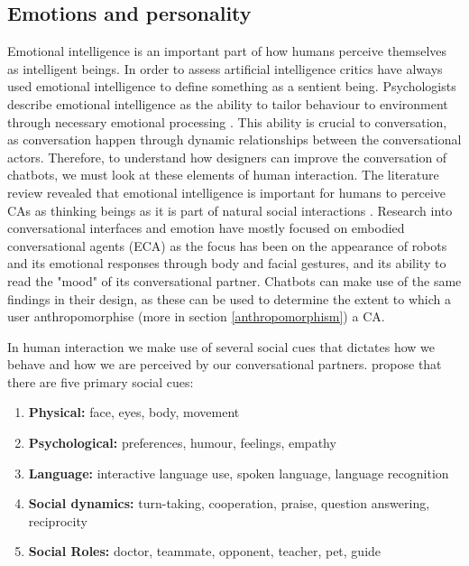 \subsection{Emotions and personality}
    \label{emotionspersonality}
Emotional intelligence is an important part of how humans perceive themselves as intelligent beings. In order to assess artificial intelligence critics have always used emotional intelligence to define something as a sentient being. Psychologists describe emotional intelligence as the ability to tailor behaviour to environment through necessary emotional processing \citep{callejas2011}. This ability is crucial to conversation, as conversation happen through dynamic relationships between the conversational actors. Therefore, to understand how designers can improve the conversation of chatbots, we must look at these elements of human interaction. The literature review revealed that emotional intelligence is important for humans to perceive CAs as thinking beings as it is part of natural social interactions \citep{Griol2015a,Griol2017,Balzarotti2014,Lemon2012,Mencia2012,McTear2016a}. Research into conversational interfaces and emotion have mostly focused on embodied conversational agents (ECA) \citep{Lester1997,Stern2003, Beun2003,Reeves1996} as the focus has been on the appearance of robots and its emotional responses through body and facial gestures, and its ability to read the "mood" of its conversational partner. Chatbots can make use of the same findings in their design, as these can be used to determine the extent to which a user anthropomorphise (more in section \ref{anthropomorphism}) a CA.

In human interaction we make use of several social cues that dictates how we behave and how we are perceived by our conversational partners. \cite{Fogg2002} propose that there are five primary social cues: 
\begin{enumerate}
    \item \textbf{Physical:} face, eyes, body, movement
    \item \textbf{Psychological:} preferences, humour, feelings, empathy
    \item \textbf{Language:} interactive language use, spoken language, language recognition
    \item \textbf{Social dynamics:} turn-taking, cooperation, praise, question answering, reciprocity
    \item \textbf{Social Roles:} doctor, teammate, opponent, teacher, pet, guide
\end{enumerate}

